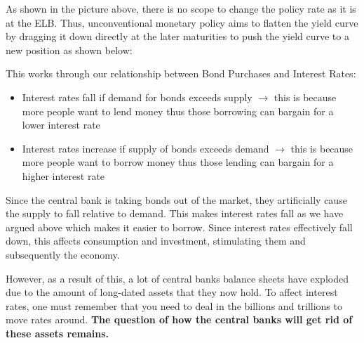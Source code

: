 \documentclass[12pt, letterpaper]{article}
\begin{document}
\begin{center}
\end{center}
As shown in the picture above, there is no scope to change the policy rate as it is at the ELB. Thus, unconventional monetary policy aims to flatten the yield curve by dragging it down directly at the later maturities to push the yield curve to a new position as shown below:
\begin{center}
\end{center}
This works through our relationship between Bond Purchases and Interest Rates:
\begin{itemize}
	\item Interest rates fall if demand for bonds exceeds supply $\rightarrow$ this is because more people want to lend money thus those borrowing can bargain for a lower interest rate
	\item Interest rates increase if supply of bonds exceeds demand $\rightarrow$ this is because more people want to borrow money thus those lending can bargain for a higher interest rate
\end{itemize}
Since the central bank is taking bonds out of the market, they artificially cause the supply to fall relative to demand. This makes interest rates fall as we have argued above which makes it easier to borrow. Since interest rates effectively fall down, this affects consumption and investment, stimulating them and subsequently the economy.

However, as a result of this, a lot of central banks balance sheets have exploded due to the amount of long-dated assets that they now hold. To affect interest rates, one must remember that you need to deal in the billions and trillions to move rates around. \textbf{The question of how the central banks will get rid of these assets remains.}\\\\
\end{document}
